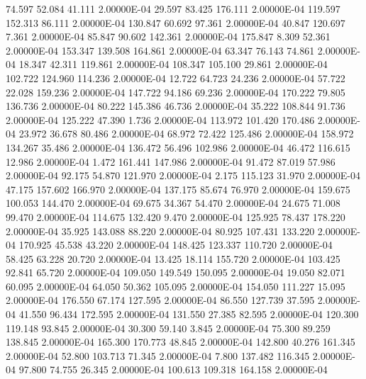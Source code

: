     74.597    52.084    41.111  2.00000E-04
    29.597    83.425   176.111  2.00000E-04
   119.597   152.313    86.111  2.00000E-04
   130.847    60.692    97.361  2.00000E-04
    40.847   120.697     7.361  2.00000E-04
    85.847    90.602   142.361  2.00000E-04
   175.847     8.309    52.361  2.00000E-04
   153.347   139.508   164.861  2.00000E-04
    63.347    76.143    74.861  2.00000E-04
    18.347    42.311   119.861  2.00000E-04
   108.347   105.100    29.861  2.00000E-04
   102.722   124.960   114.236  2.00000E-04
    12.722    64.723    24.236  2.00000E-04
    57.722    22.028   159.236  2.00000E-04
   147.722    94.186    69.236  2.00000E-04
   170.222    79.805   136.736  2.00000E-04
    80.222   145.386    46.736  2.00000E-04
    35.222   108.844    91.736  2.00000E-04
   125.222    47.390     1.736  2.00000E-04
   113.972   101.420   170.486  2.00000E-04
    23.972    36.678    80.486  2.00000E-04
    68.972    72.422   125.486  2.00000E-04
   158.972   134.267    35.486  2.00000E-04
   136.472    56.496   102.986  2.00000E-04
    46.472   116.615    12.986  2.00000E-04
     1.472   161.441   147.986  2.00000E-04
    91.472    87.019    57.986  2.00000E-04
    92.175    54.870   121.970  2.00000E-04
     2.175   115.123    31.970  2.00000E-04
    47.175   157.602   166.970  2.00000E-04
   137.175    85.674    76.970  2.00000E-04
   159.675   100.053   144.470  2.00000E-04
    69.675    34.367    54.470  2.00000E-04
    24.675    71.008    99.470  2.00000E-04
   114.675   132.420     9.470  2.00000E-04
   125.925    78.437   178.220  2.00000E-04
    35.925   143.088    88.220  2.00000E-04
    80.925   107.431   133.220  2.00000E-04
   170.925    45.538    43.220  2.00000E-04
   148.425   123.337   110.720  2.00000E-04
    58.425    63.228    20.720  2.00000E-04
    13.425    18.114   155.720  2.00000E-04
   103.425    92.841    65.720  2.00000E-04
   109.050   149.549   150.095  2.00000E-04
    19.050    82.071    60.095  2.00000E-04
    64.050    50.362   105.095  2.00000E-04
   154.050   111.227    15.095  2.00000E-04
   176.550    67.174   127.595  2.00000E-04
    86.550   127.739    37.595  2.00000E-04
    41.550    96.434   172.595  2.00000E-04
   131.550    27.385    82.595  2.00000E-04
   120.300   119.148    93.845  2.00000E-04
    30.300    59.140     3.845  2.00000E-04
    75.300    89.259   138.845  2.00000E-04
   165.300   170.773    48.845  2.00000E-04
   142.800    40.276   161.345  2.00000E-04
    52.800   103.713    71.345  2.00000E-04
     7.800   137.482   116.345  2.00000E-04
    97.800    74.755    26.345  2.00000E-04
   100.613   109.318   164.158  2.00000E-04

